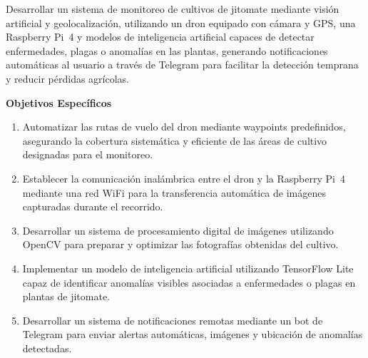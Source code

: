
Desarrollar un sistema de monitoreo de cultivos de jitomate mediante visión artificial y geolocalización, utilizando un dron equipado con cámara y GPS, una Raspberry Pi~4 y modelos de inteligencia artificial capaces de detectar enfermedades, plagas o anomalías en las plantas, generando notificaciones automáticas al usuario a través de Telegram para facilitar la detección temprana y reducir pérdidas agrícolas.\\

{\bfseries\fontsize{14pt}{16pt}\selectfont Objetivos Específicos}

\begin{enumerate}[topsep=2pt, itemsep=4pt, parsep=0pt]

\item Automatizar las rutas de vuelo del dron mediante waypoints predefinidos, asegurando la cobertura sistemática y eficiente de las áreas de cultivo designadas para el monitoreo.

\item Establecer la comunicación inalámbrica entre el dron y la Raspberry Pi~4 mediante una red WiFi para la transferencia automática de imágenes capturadas durante el recorrido.

\item Desarrollar un sistema de procesamiento digital de imágenes utilizando OpenCV para preparar y optimizar las fotografías obtenidas del cultivo.

\item Implementar un modelo de inteligencia artificial utilizando TensorFlow Lite capaz de identificar anomalías visibles asociadas a enfermedades o plagas en plantas de jitomate.

\item Desarrollar un sistema de notificaciones remotas mediante un bot de Telegram para enviar alertas automáticas, imágenes y ubicación de anomalías detectadas.

\end{enumerate}

\thispagestyle{empty}
